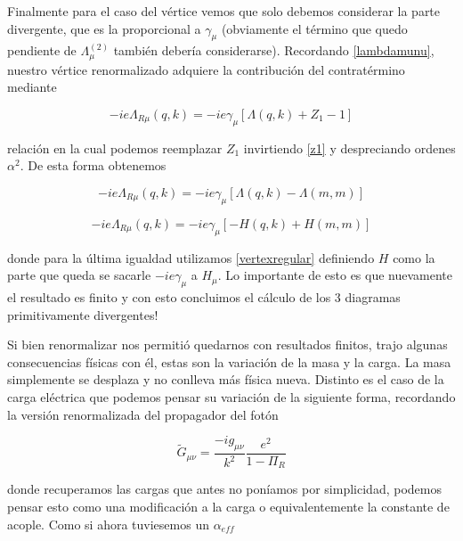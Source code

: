 \documentclass[tickz]{article}
\numberwithin{equation}{section}
\begin{document}
Finalmente para el caso del vértice vemos que solo debemos considerar la parte divergente, que es la proporcional a $ \gamma_{\mu} $ (obviamente el término que quedo pendiente de $ \Lambda^{(2)}_{\mu} $ también debería considerarse). Recordando \ref{lambdamunu}, nuestro vértice renormalizado adquiere la contribución del contratérmino mediante

\begin{equation}\label{key}
-ie\Lambda_{R\mu}(q,k) = -ie\gamma_{\mu}\left[ \Lambda(q,k) + Z_1 - 1\right]
\end{equation}

relación en la cual podemos reemplazar $ Z_1 $ invirtiendo  \ref{z1} y despreciando ordenes $ \alpha^2 $. De esta forma obtenemos

\begin{equation*}
-ie\Lambda_{R\mu}(q,k) = -ie\gamma_{\mu}\left[ \Lambda(q,k) -\Lambda(m,m)\right]
\end{equation*} 

\begin{boxquation}
\begin{equation}
-ie\Lambda_{R\mu}(q,k)=-ie\gamma_{\mu} \left[ -H(q,k) + H(m,m)\right]
\end{equation}
\end{boxquation}

donde para la última igualdad utilizamos \ref{vertexregular} definiendo $ H $ como la parte que queda se sacarle $ -ie\gamma_{\mu} $ a $ H_{\mu} $. Lo importante de esto es que nuevamente el resultado es finito y con esto concluimos el cálculo de los 3 diagramas primitivamente divergentes!


Si bien renormalizar nos permitió quedarnos con resultados finitos, trajo algunas consecuencias físicas con él, estas son la variación de la masa y la carga. La masa simplemente se desplaza y no conlleva más física nueva. Distinto es el caso de la carga eléctrica que podemos pensar su variación de la siguiente forma, recordando la versión renormalizada del propagador del fotón

\begin{equation}\label{key}
\widetilde{G}_{\mu\nu} = \frac{-ig_{\mu\nu}}{k^2} \frac{e^2}{1-\Pi_R}
\end{equation}

donde recuperamos las cargas que antes no poníamos por simplicidad, podemos pensar esto como una modificación a la carga o equivalentemente la constante de acople. Como si ahora tuviesemos un $ \alpha_{eff} $
\end{document}
